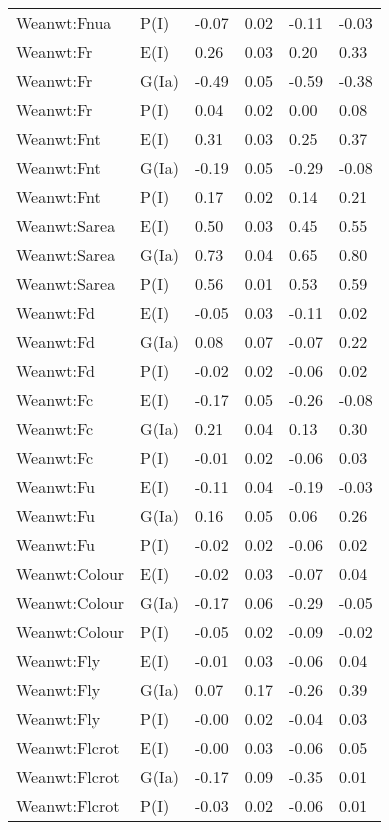 \begin{center}
\begin{longtable}{|p{1.1in}|p{0.7in}|p{0.7in}|p{0.6in}|p{0.6in}|p{0.6in}|}
  Weanwt:Fnua & P(I) & -0.07 & 0.02 & -0.11 & -0.03 \\ 
  Weanwt:Fr & E(I) & 0.26 & 0.03 & 0.20 & 0.33 \\ 
  Weanwt:Fr & G(Ia) & -0.49 & 0.05 & -0.59 & -0.38 \\ 
  Weanwt:Fr & P(I) & 0.04 & 0.02 & 0.00 & 0.08 \\ 
  Weanwt:Fnt & E(I) & 0.31 & 0.03 & 0.25 & 0.37 \\ 
  Weanwt:Fnt & G(Ia) & -0.19 & 0.05 & -0.29 & -0.08 \\ 
  Weanwt:Fnt & P(I) & 0.17 & 0.02 & 0.14 & 0.21 \\ 
  Weanwt:Sarea & E(I) & 0.50 & 0.03 & 0.45 & 0.55 \\ 
  Weanwt:Sarea & G(Ia) & 0.73 & 0.04 & 0.65 & 0.80 \\ 
  Weanwt:Sarea & P(I) & 0.56 & 0.01 & 0.53 & 0.59 \\ 
  Weanwt:Fd & E(I) & -0.05 & 0.03 & -0.11 & 0.02 \\ 
  Weanwt:Fd & G(Ia) & 0.08 & 0.07 & -0.07 & 0.22 \\ 
  Weanwt:Fd & P(I) & -0.02 & 0.02 & -0.06 & 0.02 \\ 
  Weanwt:Fc & E(I) & -0.17 & 0.05 & -0.26 & -0.08 \\ 
  Weanwt:Fc & G(Ia) & 0.21 & 0.04 & 0.13 & 0.30 \\ 
  Weanwt:Fc & P(I) & -0.01 & 0.02 & -0.06 & 0.03 \\ 
  Weanwt:Fu & E(I) & -0.11 & 0.04 & -0.19 & -0.03 \\ 
  Weanwt:Fu & G(Ia) & 0.16 & 0.05 & 0.06 & 0.26 \\ 
  Weanwt:Fu & P(I) & -0.02 & 0.02 & -0.06 & 0.02 \\ 
  Weanwt:Colour & E(I) & -0.02 & 0.03 & -0.07 & 0.04 \\ 
  Weanwt:Colour & G(Ia) & -0.17 & 0.06 & -0.29 & -0.05 \\ 
  Weanwt:Colour & P(I) & -0.05 & 0.02 & -0.09 & -0.02 \\ 
  Weanwt:Fly & E(I) & -0.01 & 0.03 & -0.06 & 0.04 \\ 
  Weanwt:Fly & G(Ia) & 0.07 & 0.17 & -0.26 & 0.39 \\ 
  Weanwt:Fly & P(I) & -0.00 & 0.02 & -0.04 & 0.03 \\ 
  Weanwt:Flcrot & E(I) & -0.00 & 0.03 & -0.06 & 0.05 \\ 
  Weanwt:Flcrot & G(Ia) & -0.17 & 0.09 & -0.35 & 0.01 \\ 
  Weanwt:Flcrot & P(I) & -0.03 & 0.02 & -0.06 & 0.01 \\ 

\end{longtable}
\end{center}
